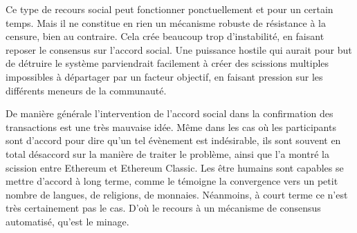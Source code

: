 %

Ce type de recours social peut fonctionner ponctuellement et pour un certain temps. Mais il ne constitue en rien un mécanisme robuste de résistance à la censure, bien au contraire. Cela crée beaucoup trop d'instabilité, en faisant reposer le consensus sur l'accord social. Une puissance hostile qui aurait pour but de détruire le système parviendrait facilement à créer des scissions multiples impossibles à départager par un facteur objectif, en faisant pression sur les différents meneurs de la communauté.

De manière générale l'intervention de l'accord social dans la confirmation des transactions est une très mauvaise idée. Même dans les cas où les participants sont d'accord pour dire qu'un tel évènement est indésirable, ils sont souvent en total désaccord sur la manière de traiter le problème, ainsi que l'a montré la scission entre Ethereum et Ethereum Classic. Les être humains sont capables se mettre d'accord à long terme, comme le témoigne la convergence vers un petit nombre de langues, de religions, de monnaies. Néanmoins, à court terme ce n'est très certainement pas le cas. D'où le recours à un mécanisme de consensus automatisé, qu'est le minage.

